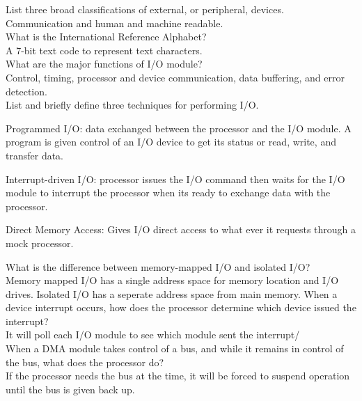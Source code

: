 \documentclass[12pt,largemargins]{homework}
\date{Septemeber 6, 2018}
\begin{document}
\maketitle
{}
List three broad classifications of external, or peripheral, devices.\\
Communication and human and machine readable.\\
What is the International Reference Alphabet?\\
A 7-bit text code to represent text characters.\\
What are the major functions of I/O module?\\
Control, timing, processor and device communication, data buffering, and error detection.\\
List and briefly define three techniques for performing I/O.\\
\begin{alphaparts}
	\item Programmed I/O: data exchanged between the processor and the I/O module.
	A program is given control of an I/O device to get its status or read, write, and transfer data.\\
	\item Interrupt-driven I/O: processor issues the I/O command then waits for the I/O module to interrupt the processor when its ready to exchange data with the processor.\\
	\item Direct Memory Access: Gives I/O direct access to what ever it requests through a mock processor.\\
\end{alphaparts}
What is the difference between memory-mapped I/O and isolated I/O?\\
Memory mapped I/O has a single address space for memory location and I/O drives. Isolated I/O has a seperate address space from main memory.
When a device interrupt occurs, how does the processor determine which device issued the interrupt?\\
It will poll each I/O module to see which module sent the interrupt/\\
When a DMA module takes control of a bus, and while it remains in control of the bus, what does the processor do?\\
If the processor needs the bus at the time, it will be forced to suspend operation until the bus is given back up.
\end{document}
